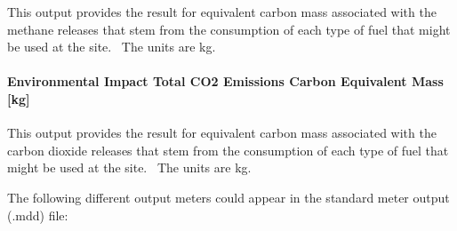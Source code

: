 This output provides the result for equivalent carbon mass associated with the methane releases that stem from the consumption of each type of fuel that might be used at the site.~ The units are kg.

\paragraph{Environmental Impact Total CO2 Emissions Carbon Equivalent Mass {[}kg{]}}\label{environmental-impact-total-co2-emissions-carbon-equivalent-mass-kg}

This output provides the result for equivalent carbon mass associated with the carbon dioxide releases that stem from the consumption of each type of fuel that might be used at the site.~ The units are kg.

The following different output meters could appear in the standard meter output (.mdd) file:


